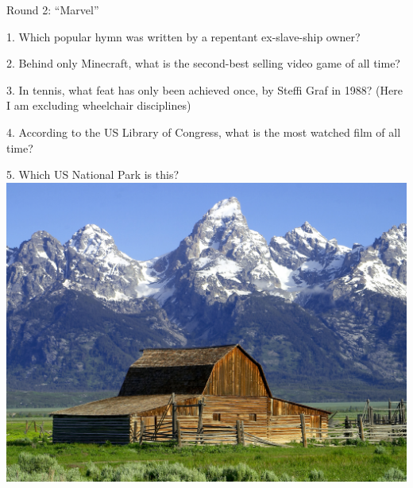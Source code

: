 \begin{frame}

\end{frame}
\begin{frame}
\begin{center}
\Huge
Round 2: ``Marvel''
\end{center}
\end{frame}
\begin{frame}
\begin{center}
\Large
1. Which popular hymn was written by a repentant ex-slave-ship owner?
\end{center}
\end{frame}
\begin{frame}
\begin{center}
\Large
2. Behind only Minecraft, what is the second-best selling video game of all time?
\end{center}
\end{frame}
\begin{frame}
\begin{center}
\Large
3. In tennis, what feat has only been achieved once, by Steffi Graf in 1988? (Here I am excluding wheelchair disciplines)
\end{center}
\end{frame}
\begin{frame}
\begin{center}
\Large
4. According to the US Library of Congress, what is the most watched film of all time?
\end{center}
\end{frame}
\begin{frame}
\begin{center}
\Large
5. Which US National Park is this?
\\
\vspace{0.5em}\includegraphics[height=0.6\paperheight]{images/grand_tetons.jpg}
\end{center}
\end{frame}
